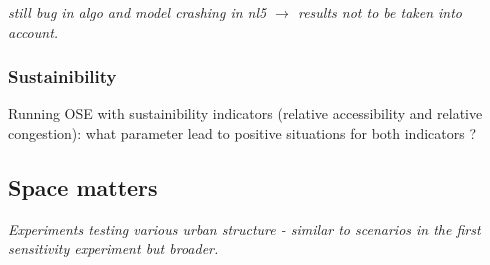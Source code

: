 \textit{still bug in algo and model crashing in nl5 $\rightarrow$ results not to be taken into account.}

\subsubsection{Sustainibility}

Running OSE with sustainibility indicators (relative accessibility and relative congestion): what parameter lead to positive situations for both indicators ?



\subsection{Space matters}

\textit{Experiments testing various urban structure - similar to scenarios in the first sensitivity experiment but broader.}










